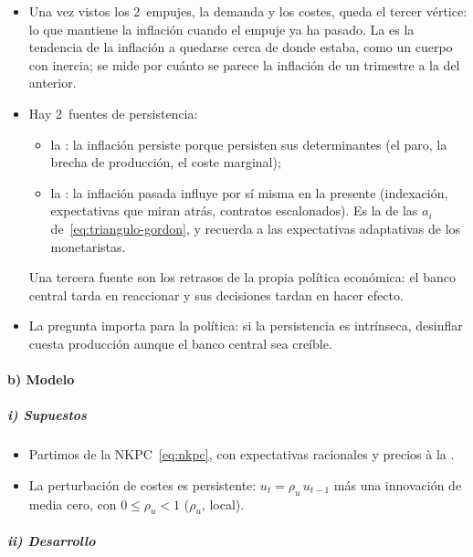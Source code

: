 \documentclass[11pt]{article}
\begin{document}
\begin{itemize}
\item Una vez vistos los 2~empujes, la demanda y los costes, queda el tercer vértice: lo que mantiene la inflación cuando el empuje ya ha pasado. La  es la tendencia de la inflación a quedarse cerca de donde estaba, como un cuerpo con inercia; se mide por cuánto se parece la inflación de un trimestre a la del anterior.
\item Hay 2~fuentes de persistencia\nocite{FuhrerMoore1995Inflation}:
  \begin{itemize}
  \item la : la inflación persiste porque persisten sus determinantes (el paro, la brecha de producción, el coste marginal);
  \item la : la inflación pasada influye por sí misma en la presente (indexación, expectativas que miran atrás, contratos escalonados). Es la de las $a_i$ de~\eqref{eq:triangulo-gordon}, y recuerda a las expectativas adaptativas de los monetaristas.
  \end{itemize}
  Una tercera fuente son los retrasos de la propia política económica: el banco central tarda en reaccionar y sus decisiones tardan en hacer efecto.
\item La pregunta importa para la política: si la persistencia es intrínseca, desinflar cuesta producción aunque el banco central sea creíble.
\end{itemize}

\paragraph{b) Modelo}

\subparagraph{i) Supuestos}

\begin{itemize}
\item Partimos de la NKPC~\eqref{eq:nkpc}, con expectativas racionales y precios à la  .
\item La perturbación de costes es persistente: $u_t=\rho_u\,u_{t-1}$ más una innovación de media cero, con $0\leq\rho_u<1$ ($\rho_u$, local).
\end{itemize}

\subparagraph{ii) Desarrollo}
\end{document}
